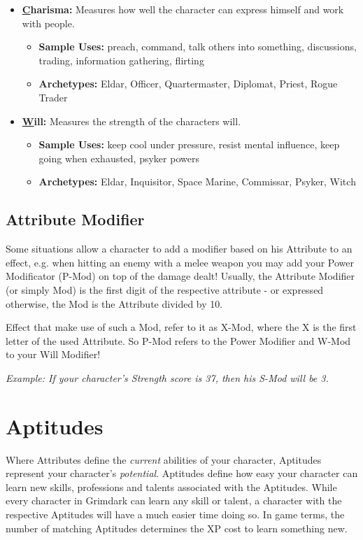\begin{itemize}
	\item {\large\textbf{\underline{C}harisma:}} Measures how well the character can express himself and work with people.
	\begin{itemize}
		\item \textbf{Sample Uses:} preach, command, talk others into something, discussions, trading, information gathering, flirting
		\item \textbf{Archetypes:} Eldar, Officer, Quartermaster, Diplomat, Priest, Rogue Trader
	\end{itemize}

	\item {\large\textbf{\underline{W}ill:}} Measures the strength of the characters will.
	\begin{itemize}
		\item \textbf{Sample Uses:} keep cool under pressure, resist mental influence, keep going when exhausted, psyker powers
		\item \textbf{Archetypes:} Eldar, Inquisitor, Space Marine, Commissar, Psyker, Witch
	\end{itemize}
\end{itemize}


\subsection{Attribute Modifier}
Some situations allow a character to add a modifier based on his Attribute to an effect, e.g. when hitting an enemy with a melee weapon you may add your Power Modificator (P-Mod) on top of the damage dealt!
Usually, the Attribute Modifier (or simply Mod) is the first digit of the respective attribute - or expressed otherwise, the Mod is the Attribute divided by 10. 

Effect that make use of such a Mod, refer to it as X-Mod, where the X is the first letter of the used Attribute.
So P-Mod refers to the Power Modifier and W-Mod to your Will Modifier!

\textit{Example: If your character's Strength score is 37, then his S-Mod will be 3.}

\section{Aptitudes}\label{Aptitudes}
Where Attributes define the \textit{current} abilities of your character, Aptitudes represent your character's \textit{potential}.
Aptitudes define how easy your character can learn new skills, professions and talents associated with the Aptitudes.
While every character in Grimdark can learn any skill or talent, a character with the respective Aptitudes will have a much easier time doing so.
In game terms, the number of matching Aptitudes determines the XP cost to learn something new.

